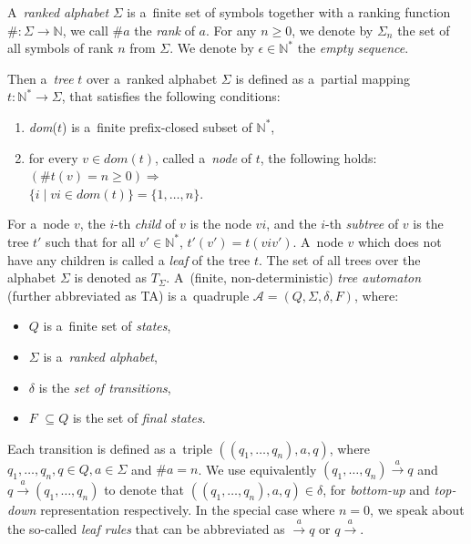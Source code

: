  A~\emph{ranked alphabet} $\Sigma$ is a~finite set of symbols together with a
 ranking function $\#: \Sigma \to \mathbb{N}$, we call $\#a$ the \emph{rank}
 of $a$. For any $n \geq 0$, we denote by $\Sigma_n$ the set of all symbols of rank
 $n$ from $\Sigma$. We denote by $\epsilon \in \mathbb{N}^*$ the \emph{empty
 sequence}.

Then a~\emph{tree} $t$ over a~ranked alphabet $\Sigma$ is defined as a~partial
mapping $t : \mathbb{N}^* \to \Sigma$, that satisfies the following conditions:
 \begin{enumerate}
  \item \emph{dom}($t$) is a~finite prefix-closed subset of $\mathbb{N}^*$,
  \item for every $v \in dom(t)$, called a~\emph{node} of $t$, the following
holds: $(\#t(v) = n \geq 0) \Longrightarrow$\\ $\{i \mid vi \in dom(t)\} =
\{1,\ldots,n\}$.
 \end{enumerate}

For a~node $v$, the $i$-th \emph{child} of $v$ is the node $vi$, and the $i$-th
\emph{subtree} of $v$ is the tree $t'$ such that for all $v' \in \mathbb{N}^*$, 
$t'(v') = t(viv')$. A~node $v$ which does not have any children is called a
\emph{leaf} of the tree $t$. The set of all trees over the alphabet $\Sigma$ is
denoted as $T_\Sigma$.
\newpage
A~(finite, non-deterministic) \emph{tree automaton} (further abbreviated as TA)
is a~quadruple $\mathcal{A} = (Q, \Sigma, \delta, F)$, where:
 \begin{itemize}
   \item $Q$ is a~finite set of \emph{states},
	\item $\Sigma$ is a~\emph{ranked alphabet},
	\item $\delta$ is the \emph{set of transitions},
	\item $F$ $ \subseteq Q$ is the set of \emph{final states}.
 \end{itemize}

Each transition is defined as a~triple $((q_1,\ldots,q_n), a, q)$, where
$q_1,\ldots,q_n,q \in Q, a \in \Sigma$ and $\#a = n$. We use equivalently
$(q_1,\ldots,q_n) \overset{a}{\longrightarrow} q$ and $q
\overset{a}{\longrightarrow}  (q_1,\ldots,q_n)$ to denote that
$((q_1,\ldots,q_n), a, q) \in \delta$, for \emph{bottom-up} and \emph{top-down}
representation respectively. In the special case where $n = 0$, we speak about
the so-called \emph{leaf rules} that can be abbreviated as
$\overset{a}{\longrightarrow}  q$ or $q \overset{a}{\longrightarrow} $.

